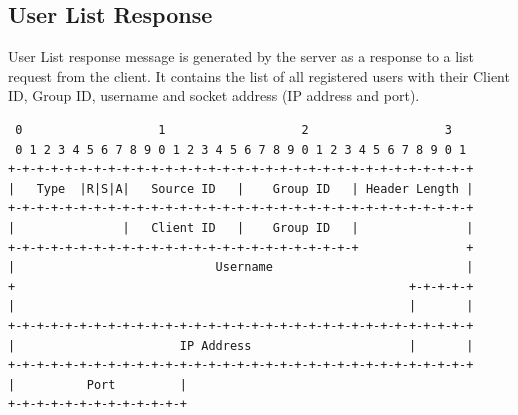 \documentclass{article}
\begin{document}
\subsection{User List Response}
User List response message is generated by the server as a response to a list request from the client. It contains the list of all registered users with their Client ID, Group ID, username and socket address (IP address and port).
\begin{verbatim}  
 0                   1                   2                   3  
 0 1 2 3 4 5 6 7 8 9 0 1 2 3 4 5 6 7 8 9 0 1 2 3 4 5 6 7 8 9 0 1
+-+-+-+-+-+-+-+-+-+-+-+-+-+-+-+-+-+-+-+-+-+-+-+-+-+-+-+-+-+-+-+-+
|   Type  |R|S|A|   Source ID   |    Group ID   | Header Length |
+-+-+-+-+-+-+-+-+-+-+-+-+-+-+-+-+-+-+-+-+-+-+-+-+-+-+-+-+-+-+-+-+
|               |   Client ID   |    Group ID   |               |
+-+-+-+-+-+-+-+-+-+-+-+-+-+-+-+-+-+-+-+-+-+-+-+-+               +
|                            Username                           |
+                                                       +-+-+-+-+
|                                                       |       |
+-+-+-+-+-+-+-+-+-+-+-+-+-+-+-+-+-+-+-+-+-+-+-+-+-+-+-+-+-+-+-+-+
|                       IP Address                      |       |
+-+-+-+-+-+-+-+-+-+-+-+-+-+-+-+-+-+-+-+-+-+-+-+-+-+-+-+-+-+-+-+-+
|          Port         |
+-+-+-+-+-+-+-+-+-+-+-+-+
\end{verbatim}
\end{document}
